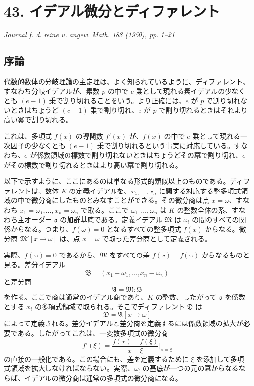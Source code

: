 \documentclass[11pt]{article}
\begin{document}
\clearpage

\section*{43. イデアル微分とディファレント}

\begin{center}
\emph{Journal f. d. reine u. angew. Math. 188 (1950), pp. 1--21}
\end{center}

\subsection*{序論}

代数的数体の分岐理論の主定理は、よく知られているように、ディファレント、すなわち分岐イデアルが、素数 \(p\) の中で \(e\) 乗として現れる素イデアルの少なくとも \((e-1)\) 乗で割り切れることをいう。より正確には、\(e\) が \(p\) で割り切れないときはちょうど \((e-1)\) 乗で割り切れ、\(e\) が \(p\) で割り切れるときはそれより高い冪で割り切れる。

これは、多項式 \(f(x)\) の導関数 \(f'(x)\) が、\(f(x)\) の中で \(e\) 乗として現れる一次因子の少なくとも \((e-1)\) 乗で割り切れるという事実に対応している。すなわち、\(e\) が係数領域の標数で割り切れないときはちょうどその冪で割り切れ、\(e\) がその標数で割り切れるときはより高い冪で割り切れる。

以下で示すように、ここにあるのは単なる形式的類似以上のものである。ディファレントは、数体 \(K\) の定義イデアルを、\(x_1,\ldots,x_n\) に関する対応する整多項式領域の中で微分商にしたものとみなすことができる。その微分商は点 \(x=\omega\)、すなわち \(x_1=\omega_1,\ldots,x_n=\omega_n\) で取る。ここで \(\omega_1,\ldots,\omega_n\) は \(K\) の整数全体の系、すなわち主オーダー \(\mathfrak o\) の加群基底である。定義イデアル \(\mathfrak M\) は \(\omega_i\) の間のすべての関係からなる。つまり、\(f(\omega)=0\) となるすべての整多項式 \(f(x)\) からなる。微分商 \(\mathfrak M'[x\to\omega]\) は、点 \(x=\omega\) で取った差分商として定義される。

実際、\(f(\omega)=0\) であるから、\(\mathfrak M\) をすべての差 \(f(x)-f(\omega)\) からなるものと見る。差分イデアル
\[
        \mathfrak B=(x_1-\omega_1,\ldots,x_n-\omega_n)
\]
と差分商
\[
        \mathfrak A=\mathfrak M:\mathfrak B
\]
を作る。ここで商は通常のイデアル商であり、\(K\) の整数、したがって \(\mathfrak o\) を係数とする \(x_i\) の多項式領域で取られる。そこでディファレント \(\mathfrak D\) は
\[
        \mathfrak D=\mathfrak A[x\to\omega]
\]
によって定義される。差分イデアルと差分商を定義するには係数領域の拡大が必要である。したがってこれは、一変数多項式の微分商
\[
        f'(\xi)=\frac{f(x)-f(\xi)}{x-\xi}\bigg|_{x=\xi}
\]
の直接の一般化である。この場合にも、差を定義するために \(\xi\) を添加して多項式領域を拡大しなければならない。実際、\(\omega_i\) の基底が一つの元の冪からなるならば、イデアルの微分商は通常の多項式の微分商になる。
\end{document}
